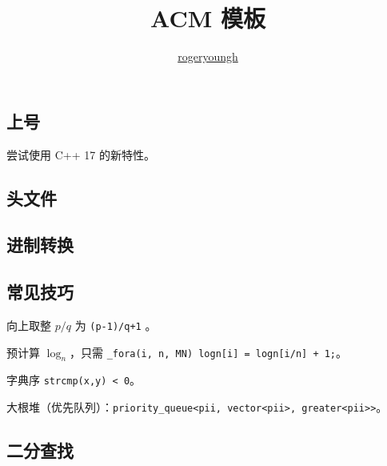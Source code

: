 \documentclass{probook}
\title{ACM 模板}
\author{\href{https://github.com/rogeryoungh}{rogeryoungh}}
\begin{document}
\newcommand\mfrac[2]{\dfrac{#1\smash[b]{\strut}}{#2\smash[t]{\strut}}}
\newcommand\ee{\mathrm{e}}
\newcommand\dd{\mathrm{d}}
\newcommand\uppi{\mathrm{\pi}}

\newcommand{\lcm}{\operatorname{lcm}}
\newcommand{\DFT}{\operatorname{DFT}_{\omega_n}}
\newcommand{\Id}{\operatorname{Id}}

\maketitle

\frontmatter

\columnseprule=2pt
\setlength{\columnsep}{30pt}
\begin{multicols}{2}

\tableofcontents

\mainmatter






\chapter{上号}

尝试使用 C++ 17 的新特性。

\section{头文件}



\section{进制转换}



\section{常见技巧}

向上取整 $p/q$ 为 \lstinline{(p-1)/q+1} 。

预计算 $\log_n$，只需 \lstinline{_fora(i, n, MN) logn[i] = logn[i/n] + 1;}。

字典序 \lstinline{strcmp(x,y) < 0}。

大根堆（优先队列）：\lstinline{priority_queue<pii, vector<pii>, greater<pii>>}。

\section{二分查找}


\end{multicols}
\end{document}
